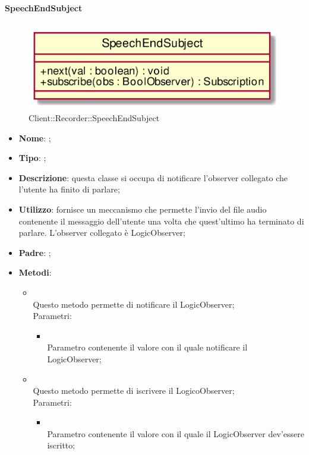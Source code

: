 \hypertarget{SpeechEndSubject_label}{\paragraph{SpeechEndSubject}}
\begin{figure}[h]
	\centering
	\includegraphics[width=\textwidth,height=\textheight,keepaspectratio]{images/ClassSpeechEndSubject.png}
	\caption{Client::Recorder::SpeechEndSubject}
\end{figure}
\begin{itemize}
	\item \textbf{Nome}: ;
	\item \textbf{Tipo}: ;
	\item \textbf{Descrizione}: questa classe si occupa di notificare l'observer collegato che l'utente ha finito di parlare;
	\item \textbf{Utilizzo}: fornisce un meccanismo che permette l'invio del file audio contenente il messaggio dell'utente una volta che quest'ultimo ha terminato di parlare.
L'observer collegato è LogicObserver;
	\item \textbf{Padre}: ;
	\item \textbf{Metodi}:
	\begin{itemize}
		\item[]  \\
		Questo metodo permette di notificare il LogicObserver;\\
		Parametri:
		\begin{itemize}
			\item {} \\
			Parametro contenente il valore con il quale notificare il LogicObserver;
		\end{itemize}
		\item[]  \\
		Questo metodo permette di iscrivere il LogicoObserver;\\
		Parametri:
		\begin{itemize}
			\item {} \\
			Parametro contenente il valore con il quale il LogicObserver dev'essere iscritto;
		\end{itemize}
	\end{itemize}
\end{itemize}
\FloatBarrier

